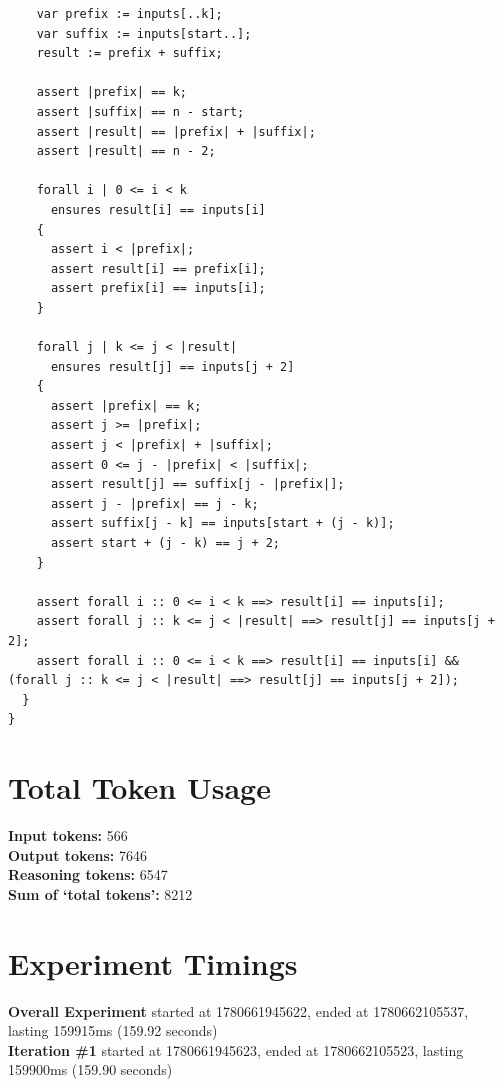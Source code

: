 \documentclass{article}
\begin{document}
\begin{lstlisting}
    var prefix := inputs[..k];
    var suffix := inputs[start..];
    result := prefix + suffix;

    assert |prefix| == k;
    assert |suffix| == n - start;
    assert |result| == |prefix| + |suffix|;
    assert |result| == n - 2;

    forall i | 0 <= i < k
      ensures result[i] == inputs[i]
    {
      assert i < |prefix|;
      assert result[i] == prefix[i];
      assert prefix[i] == inputs[i];
    }

    forall j | k <= j < |result|
      ensures result[j] == inputs[j + 2]
    {
      assert |prefix| == k;
      assert j >= |prefix|;
      assert j < |prefix| + |suffix|;
      assert 0 <= j - |prefix| < |suffix|;
      assert result[j] == suffix[j - |prefix|];
      assert j - |prefix| == j - k;
      assert suffix[j - k] == inputs[start + (j - k)];
      assert start + (j - k) == j + 2;
    }

    assert forall i :: 0 <= i < k ==> result[i] == inputs[i];
    assert forall j :: k <= j < |result| ==> result[j] == inputs[j + 2];
    assert forall i :: 0 <= i < k ==> result[i] == inputs[i] && (forall j :: k <= j < |result| ==> result[j] == inputs[j + 2]);
  }
}
\end{lstlisting}
\section*{Total Token Usage}
\textbf{Input tokens: }566
\\\textbf{Output tokens: }7646
\\\textbf{Reasoning tokens: }6547
\\\textbf{Sum of `total tokens': }8212
\section*{Experiment Timings}
\textbf{Overall Experiment} started at 1780661945622, ended at 1780662105537, lasting 159915ms (159.92 seconds)
\\\textbf{Iteration \#1} started at 1780661945623, ended at 1780662105523, lasting 159900ms (159.90 seconds)
\end{document}
